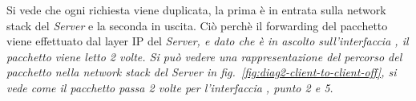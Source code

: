 Si vede che ogni richiesta viene duplicata, la prima è in entrata sulla network stack del \textit{Server} e la seconda in uscita. Ciò perchè il forwarding del pacchetto viene effettuato dal layer IP del \it{Server}, e dato che  è in ascolto sull'interfaccia , il pacchetto viene letto 2 volte. Si può vedere una rappresentazione del percorso del pacchetto nella network stack del \it{Server} in fig.~\ref{fig:diag2-client-to-client-off}, si vede come il pacchetto passa 2 volte per l'interfaccia , punto 2 e 5. 


